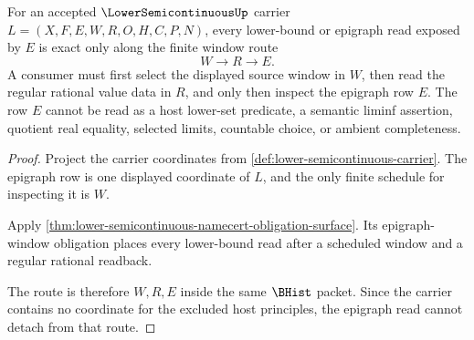 
\begin{theorem}
\label{thm:lowersemicontinuous-epigraph-window-exactness}
For an accepted $\LowerSemicontinuousUp$ carrier
$L=(X,F,E,W,R,O,H,C,P,N)$, every lower-bound or epigraph read exposed by
$E$ is exact only along the finite window route
$$
W \longrightarrow R \longrightarrow E .
$$
A consumer must first select the displayed source window in $W$, then read the
regular rational value data in $R$, and only then inspect the epigraph row
$E$. The row $E$ cannot be read as a host lower-set predicate, a semantic
liminf assertion, quotient real equality, selected limits, countable choice,
or ambient completeness.
\end{theorem}
\begin{proof}
Project the carrier coordinates from
\autoref{def:lower-semicontinuous-carrier}. The epigraph row is one displayed
coordinate of $L$, and the only finite schedule for inspecting it is $W$.

Apply \autoref{thm:lower-semicontinuous-namecert-obligation-surface}. Its
epigraph-window obligation places every lower-bound read after a scheduled
window and a regular rational readback.

The route is therefore $W,R,E$ inside the same $\BHist$ packet. Since the
carrier contains no coordinate for the excluded host principles, the epigraph
read cannot detach from that route.
\end{proof}

